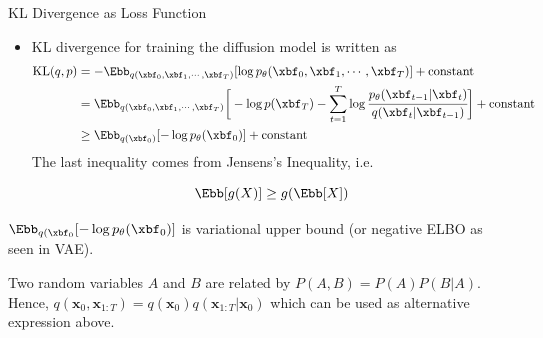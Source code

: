\documentclass[aspectratio=169,xcolor=dvipsnames,svgnames,x11names,fleqn]{beamer}
\begin{document}
    \begin{frame}{KL Divergence as Loss Function}
        \begin{itemize}
            \item KL divergence for training the diffusion model is written as
                \begin{align*}
                      \text{KL}(q, p) & = -\Ebb_{q(\xbf_0,\xbf_1, \cdots,\xbf_T)} [\log p_\theta(\xbf_0,\xbf_1, \cdots,\xbf_T)] + \text{constant}\\
                      & = \Ebb_{q(\xbf_0,\xbf_1, \cdots,\xbf_T)}\bigg[ -\log p(\xbf_T) - \sum_{t=1}^T\log \cfrac{p_\theta(\xbf_{t-1}| \xbf_t)}{q(\xbf_{t}| \xbf_{t-1})} \bigg] + \text{constant}\\
                      & \geq \Ebb_{q(\xbf_0)}[-\log p_\theta(\xbf_0)] + \text{constant} 
                \end{align*}
          The last inequality comes from Jensens's Inequality, i.e. 
    
          $$
          \Ebb[g(X)] \geq g( \Ebb[X] )
          $$
          
          
        \end{itemize}
        
        $\Ebb_{q(\xbf_0}[-\log p_\theta(\xbf_0)]$ is variational upper bound (or negative ELBO as seen in VAE).
        
        \begin{center}
        \tiny

        Two random variables $A$ and $B$ are related by $P(A, B) = P(A) P (B|A)$. Hence,  $q(\mathbf{x}_0, \mathbf{x}_{1:T}) = q(\mathbf{x}_0) q(\mathbf{x}_{1:T} | \mathbf{x}_0)$ which can be used as alternative expression above.
        
        \end{center}
    \end{frame}
    
\end{document}
